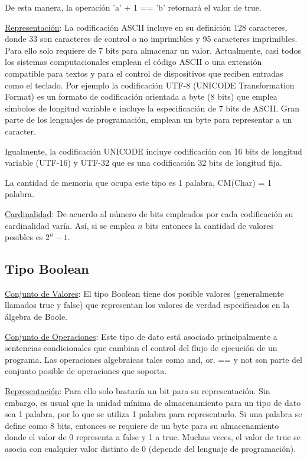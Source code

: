 De esta manera, la operación 'a' + 1 == 'b' retornará el valor de true.

\underline{Representación}: La codificación ASCII incluye en su definición 128 caracteres, donde 33 son caracteres de control o no imprimibles y 95 caracteres imprimibles. Para ello solo requiere de 7 bits para almacenar un valor. Actualmente, casi todos los sistemas computacionales emplean el código ASCII o una extensión compatible para textos y para el control de dispositivos que reciben entradas como el teclado. Por ejemplo la codificación UTF-8 (UNICODE Transformation Format) es un formato de codificación orientada a byte (8 bits) que emplea símbolos de longitud variable e incluye la especificación de 7 bits de ASCII. Gran parte de los lenguajes de programación, emplean un byte para representar a un caracter.

Igualmente, la codificación UNICODE incluye codificación con 16 bits de longitud variable (UTF-16) y UTF-32 que es una codificación 32 bits de longitud fija.

La cantidad de memoria que ocupa este tipo es 1 palabra, CM(Char) = 1 palabra.

\underline{Cardinalidad}: De acuerdo al número de bits empleados por cada codificación su cardinalidad varía. Así, si se emplea $n$ bits entonces la cantidad de valores posibles es $2^n - 1$.

\subsection{Tipo Boolean}

\underline{Conjunto de Valores}: El tipo Boolean tiene dos posible valores (generalmente llamados true y false) que representan los valores de verdad especificados en la álgebra de Boole.

\underline{Conjunto de Operaciones}: Este tipo de dato está asociado principalmente a sentencias condicionales que cambian el control del flujo de ejecución de un programa. Las operaciones algebraicas tales como and, or, == y not son parte del conjunto posible de operaciones que soporta.

\underline{Representación}: Para ello solo bastaría un bit para su representación. Sin embargo, es usual que la unidad mínima de almacenamiento para un tipo de dato sea 1 palabra, por lo que se utiliza 1 palabra para representarlo. Si una palabra se define como 8 bits, entonces se requiere de un byte para su almacenamiento donde el valor de 0 representa a false y 1 a true. Muchas veces, el valor de true se asocia con cualquier valor distinto de 0 (depende del lenguaje de programación).

